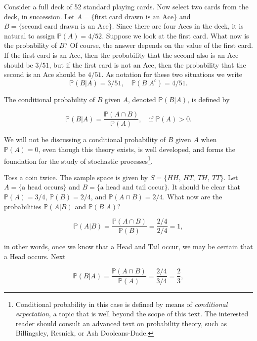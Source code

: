 \documentclass[]{book}
\let\rmarkdownfootnote\footnote%
\def\footnote{\protect\rmarkdownfootnote}
\numberwithin{equation}{chapter}
\numberwithin{figure}{chapter}
\theoremstyle{plain}
\theoremstyle{definition}
\theoremstyle{remark}
\theoremstyle{definition}
\theoremstyle{definition}
\theoremstyle{remark}
\let\BeginKnitrBlock\begin \let\EndKnitrBlock\end
\begin{document}
Consider a full deck of 52 standard playing cards. Now select two cards
from the deck, in succession. Let
\(A = \{ \mbox{first card drawn is an Ace} \}\) and
\(B = \{ \mbox{second card drawn is an Ace} \}\). Since there are four
Aces in the deck, it is natural to assign \(\mathbb{P}(A) = 4/52\).
Suppose we look at the first card. What now is the probability of \(B\)?
Of course, the answer depends on the value of the first card. If the
first card is an Ace, then the probability that the second also is an
Ace should be \(3/51\), but if the first card is not an Ace, then the
probability that the second is an Ace should be \(4/51\). As notation
for these two situations we write \[ 
\mathbb{P}(B\vert A)=3/51,\quad
\mathbb{P}(B\vert A^{c})=4/51.  
\]

\bigskip

\BeginKnitrBlock{definition}
\protect\hypertarget{def:unnamed-chunk-152}{}{\label{def:unnamed-chunk-152}}The
conditional probability of \(B\) given \(A\), denoted
\(\mathbb{P}(B|A)\), is defined by

\begin{equation}
\mathbb{P}(B|A)=\frac{\mathbb{P}(A\cap B)}{\mathbb{P}(A)},\quad \mbox{if }\mathbb{P}(A)>0.
\end{equation}
\EndKnitrBlock{definition}

We will not be discussing a conditional probability of \(B\) given \(A\)
when \(\mathbb{P}(A)=0\), even though this theory exists, is well
developed, and forms the foundation for the study of stochastic
processes\footnote{Conditional probability in this case is defined by
  means of \emph{conditional expectation}, a topic that is well beyond
  the scope of this text. The interested reader should consult an
  advanced text on probability theory, such as Billingsley, Resnick, or
  Ash Dooleans-Dade.}.

Toss a coin twice. The sample space is given by \(S=\{ HH,\ HT,\ TH,\
TT \}\). Let \(A= \{ \mbox{a head occurs} \}\) and
\(B= \{ \mbox{a head and tail occur} \}\). It should be clear that
\(\mathbb{P}(A)=3/4\), \(\mathbb{P}(B)=2/4\), and
\(\mathbb{P}(A\cap B)=2/4\). What now are the probabilities
\(\mathbb{P}(A|B)\) and \(\mathbb{P}(B|A)\)?

\[ \mathbb{P}(A|B)=\frac{\mathbb{P}(A\cap
B)}{\mathbb{P}(B)}=\frac{2/4}{2/4}=1, \]

in other words, once we know that a Head and Tail occur, we may be
certain that a Head occurs. Next

\[ 
\mathbb{P}(B|A)=\frac{\mathbb{P}(A\cap
B)}{\mathbb{P}(A)}=\frac{2/4}{3/4}=\frac{2}{3}, 
\]
\end{document}
